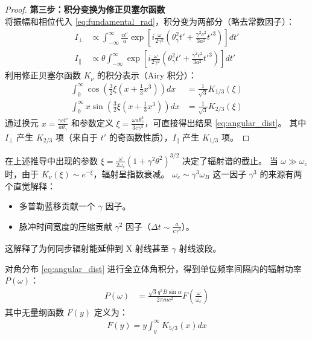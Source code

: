 \begin{proof}
    \textbf{第三步：积分变换为修正贝塞尔函数} \\
    将振幅和相位代入 \eqref{eq:fundamental_rad}，积分变为两部分（略去常数因子）：
    \begin{align}
        I_\perp &\propto \int_{-\infty}^{\infty} \frac{ct'}{a} \exp\left[ i \frac{\omega}{2\gamma^2} \left( \theta_\gamma^2 t' + \frac{\gamma^2 c^2}{3a^2} t'^3 \right) \right] dt' \\
        I_\parallel &\propto \theta \int_{-\infty}^{\infty} \exp\left[ i \frac{\omega}{2\gamma^2} \left( \theta_\gamma^2 t' + \frac{\gamma^2 c^2}{3a^2} t'^3 \right) \right] dt'
    \end{align}
    利用修正贝塞尔函数 $K_\nu$ 的积分表示（Airy 积分）：
    \begin{align}
        \int_0^\infty \cos\left( \frac{3}{2}\xi \left( x + \frac{1}{3}x^3 \right) \right) dx &= \frac{1}{\sqrt{3}} K_{1/3}(\xi) \\
        \int_0^\infty x \sin\left( \frac{3}{2}\xi \left( x + \frac{1}{3}x^3 \right) \right) dx &= \frac{1}{\sqrt{3}} K_{2/3}(\xi)
    \end{align}
    通过换元 $x = \frac{\gamma c t'}{a \theta_\gamma}$ 和参数定义 $\xi = \frac{\omega a \theta_\gamma^3}{3c\gamma^3}$，可直接得出结果 \eqref{eq:angular_dist}。
    其中 $I_\perp$ 产生 $K_{2/3}$ 项（来自于 $t'$ 的奇函数性质），$I_\parallel$ 产生 $K_{1/3}$ 项。
\end{proof}

\begin{derivationnote}[临界频率的物理意义]
    在上述推导中出现的参数 $\xi = \frac{\omega}{2\omega_c}(1+\gamma^2\theta^2)^{3/2}$ 决定了辐射谱的截止。
    当 $\omega \gg \omega_c$ 时，由于 $K_\nu(\xi) \sim e^{-\xi}$，辐射呈指数衰减。
    $\omega_c \sim \gamma^3 \omega_B$ 这一因子 $\gamma^3$ 的来源有两个直觉解释：
    \begin{itemize}
        \item 多普勒蓝移贡献一个 $\gamma$ 因子。
        \item 脉冲时间宽度的压缩贡献 $\gamma^2$ 因子（$\Delta t \sim \frac{a}{c\gamma^3}$）。
    \end{itemize}
    这解释了为何同步辐射能延伸到 X 射线甚至 $\gamma$ 射线波段。
\end{derivationnote}

\begin{theorem}[同步辐射的总功率谱]
    对角分布 \eqref{eq:angular_dist} 进行全立体角积分，得到单位频率间隔内的辐射功率 $P(\omega)$：
    \begin{align}
        P(\omega) &= \frac{\sqrt{3} q^3 B \sin\alpha}{2\pi m c^2} F\left( \frac{\omega}{\omega_c} \right) \label{eq:power_spec}
    \end{align}
    其中无量纲函数 $F(y)$ 定义为：
    \begin{align}
        F(y) = y \int_y^\infty K_{5/3}(x) dx
    \end{align}
\end{theorem}

